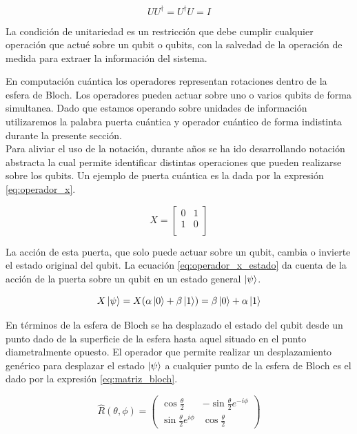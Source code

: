 \begin{equation}
    U U^{\dagger} = U^{\dagger} U = I
    \label{eq:operador_unitario}
\end{equation}

La condición de unitariedad es un restricción que debe cumplir cualquier operación que actué sobre un qubit o qubits, con la salvedad de la operación de medida para extraer la información del sistema.

\newpage

En computación cuántica los operadores representan rotaciones dentro de la esfera de Bloch. Los operadores pueden actuar sobre uno o varios qubits de forma simultanea. Dado que estamos operando sobre unidades de información utilizaremos la palabra puerta cuántica y operador cuántico de forma indistinta durante la presente sección.  \\

Para aliviar el uso de la notación, durante años se ha ido desarrollando notación abstracta la cual permite identificar distintas operaciones que pueden realizarse sobre los qubits. Un ejemplo de puerta cuántica es la dada por la expresión \ref{eq:operador_x}.


\begin{equation}
    X = \begin{bmatrix}
    0 & 1 \\
    1 & 0 \\
    \end{bmatrix}
    \label{eq:operador_x}
\end{equation}

La acción de esta puerta, que solo puede actuar sobre un qubit, cambia o invierte el estado original del qubit. La ecuación \ref{eq:operador_x_estado} da cuenta de la acción de la puerta sobre un qubit en un estado general $\ket{\psi}$.

\begin{equation}
    X \ket{\psi} = X(\alpha\ket{0} + \beta\ket{1}) = \beta\ket{0} + \alpha\ket{1}
    \label{eq:operador_x_estado}
\end{equation}

En términos de la esfera de Bloch se ha desplazado el estado del qubit desde un punto dado de la superficie de la esfera hasta aquel situado en el punto diametralmente opuesto. El operador que permite realizar un desplazamiento genérico para desplazar el estado $\ket{\psi}$ a cualquier punto de la esfera de Bloch es el dado por la expresión \ref{eq:matriz_bloch}.

\begin{equation}
    \hat{R}(\theta, \phi) = 
    \begin{pmatrix}
        \cos{\frac{\theta}{2}} & -\sin{\frac{\theta}{2}}e^{-i\phi} \\
        \sin{\frac{\theta}{2}}e^{i\phi} & \cos{\frac{\theta}{2}}
    \end{pmatrix}
    \label{eq:matriz_bloch}
\end{equation}

